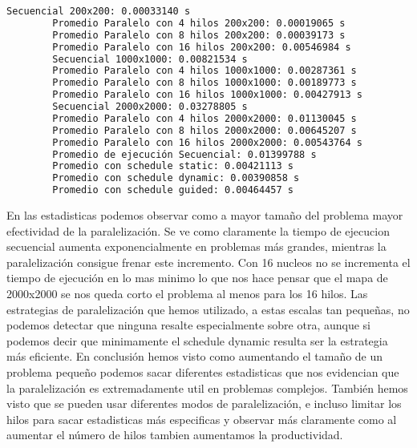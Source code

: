 \documentclass{article}
\begin{document}
	
	\begin{lstlisting}[style=consola, language=bash, caption={Salida de la ejecución del Ejercicio 3 resumen}]
		Secuencial 200x200: 0.00033140 s
		Promedio Paralelo con 4 hilos 200x200: 0.00019065 s
		Promedio Paralelo con 8 hilos 200x200: 0.00039173 s
		Promedio Paralelo con 16 hilos 200x200: 0.00546984 s
		Secuencial 1000x1000: 0.00821534 s
		Promedio Paralelo con 4 hilos 1000x1000: 0.00287361 s
		Promedio Paralelo con 8 hilos 1000x1000: 0.00189773 s
		Promedio Paralelo con 16 hilos 1000x1000: 0.00427913 s
		Secuencial 2000x2000: 0.03278805 s
		Promedio Paralelo con 4 hilos 2000x2000: 0.01130045 s
		Promedio Paralelo con 8 hilos 2000x2000: 0.00645207 s
		Promedio Paralelo con 16 hilos 2000x2000: 0.00543764 s
		Promedio de ejecución Secuencial: 0.01399788 s
		Promedio con schedule static: 0.00421113 s
		Promedio con schedule dynamic: 0.00390858 s
		Promedio con schedule guided: 0.00464457 s	\end{lstlisting}
	
	\noindent En las estadisticas podemos observar como a mayor tamaño del problema mayor efectividad de la paralelización. Se ve como claramente la tiempo de ejecucion secuencial aumenta exponencialmente en problemas más grandes, mientras la paralelización consigue frenar este incremento. Con 16 nucleos no se incrementa el tiempo de ejecución en lo mas minimo lo que nos hace pensar que el mapa de 2000x2000 se nos queda corto el problema al menos para los 16 hilos.
	\newline\newline
	\noindent Las estrategias de paralelización que hemos utilizado, a estas escalas tan pequeñas, no podemos detectar que ninguna resalte especialmente sobre otra, aunque si podemos decir que minimamente el schedule dynamic resulta ser la estrategia más eficiente. En conclusión hemos visto como aumentando el tamaño de un problema pequeño podemos sacar diferentes estadisticas que nos evidencian que la paralelización es extremadamente util en problemas complejos.
	\newline\newline
	\noindent También hemos visto que se pueden usar diferentes modos de paralelización, e incluso limitar los hilos para sacar estadisticas más especificas y observar más claramente como al aumentar el número de hilos tambien aumentamos la productividad.
	
\end{document}
